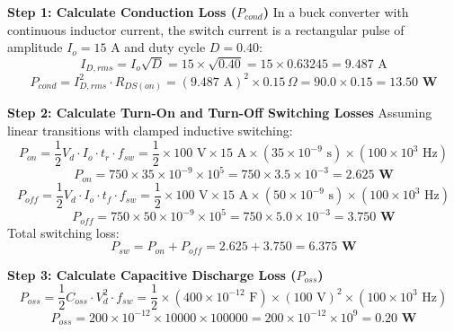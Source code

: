 \documentclass[11pt,a4paper]{article}
\begin{document}
\begin{examplebox}
\textbf{Step 1: Calculate Conduction Loss ($P_{cond}$)}
In a buck converter with continuous inductor current, the switch current is a rectangular pulse of amplitude $I_o = 15\text{ A}$ and duty cycle $D = 0.40$:
\begin{equation}
I_{D,rms} = I_o \sqrt{D} = 15 \times \sqrt{0.40} = 15 \times 0.63245 = 9.487\text{ A}
\end{equation}
\begin{equation}
P_{cond} = I_{D,rms}^2 \cdot R_{DS(on)} = (9.487\text{ A})^2 \times 0.15\,\Omega = 90.0 \times 0.15 = \mathbf{13.50\text{ W}}
\end{equation}

\textbf{Step 2: Calculate Turn-On and Turn-Off Switching Losses}
Assuming linear transitions with clamped inductive switching:
\begin{equation}
P_{on} = \frac{1}{2} V_d \cdot I_o \cdot t_r \cdot f_{sw} = \frac{1}{2} \times 100\text{ V} \times 15\text{ A} \times (35 \times 10^{-9}\text{ s}) \times (100 \times 10^3\text{ Hz})
\end{equation}
\begin{equation}
P_{on} = 750 \times 35 \times 10^{-9} \times 10^5 = 750 \times 3.5 \times 10^{-3} = \mathbf{2.625\text{ W}}
\end{equation}
\begin{equation}
P_{off} = \frac{1}{2} V_d \cdot I_o \cdot t_f \cdot f_{sw} = \frac{1}{2} \times 100\text{ V} \times 15\text{ A} \times (50 \times 10^{-9}\text{ s}) \times (100 \times 10^3\text{ Hz})
\end{equation}
\begin{equation}
P_{off} = 750 \times 50 \times 10^{-9} \times 10^5 = 750 \times 5.0 \times 10^{-3} = \mathbf{3.750\text{ W}}
\end{equation}
Total switching loss:
\begin{equation}
P_{sw} = P_{on} + P_{off} = 2.625 + 3.750 = \mathbf{6.375\text{ W}}
\end{equation}

\textbf{Step 3: Calculate Capacitive Discharge Loss ($P_{oss}$)}
\begin{equation}
P_{oss} = \frac{1}{2} C_{oss} \cdot V_d^2 \cdot f_{sw} = \frac{1}{2} \times (400 \times 10^{-12}\text{ F}) \times (100\text{ V})^2 \times (100 \times 10^3\text{ Hz})
\end{equation}
\begin{equation}
P_{oss} = 200 \times 10^{-12} \times 10000 \times 100000 = 200 \times 10^{-12} \times 10^9 = \mathbf{0.20\text{ W}}
\end{equation}


\end{examplebox}
\end{document}
